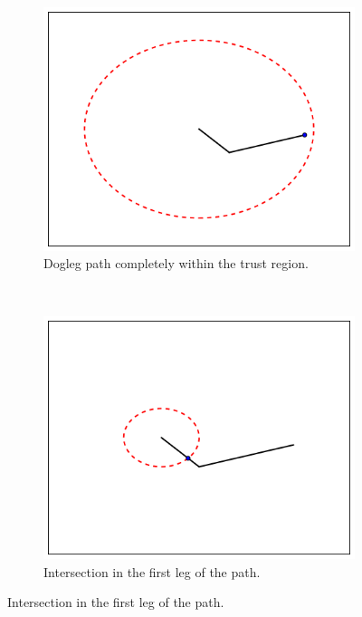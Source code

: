 \begin{figure}
\centering
    \begin{subfigure}[b]{0.3\textwidth}
            \includegraphics[width=\textwidth]{dogleg3}
            \caption{Dogleg path completely within the trust region.}
            \label{fig:dl3}
    \end{subfigure}%
    ~ %
    \begin{subfigure}[b]{0.3\textwidth}
            \includegraphics[width=\textwidth]{dogleg1}
            \caption{Intersection in the first leg of the path.}

\end{subfigure}
\end{figure}
